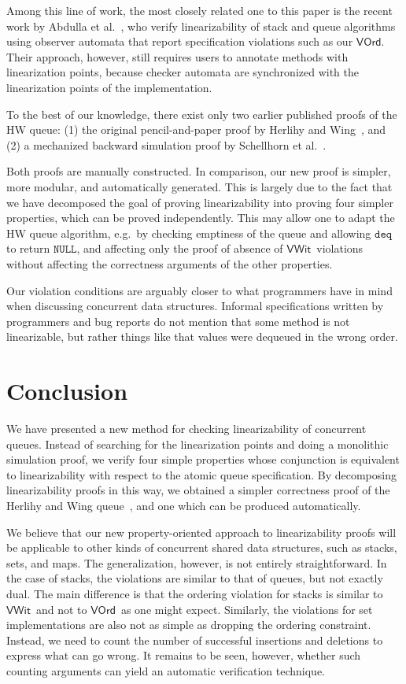 \documentclass{LMCS}
\newcommand{\NULL}{\ensuremath{\mathtt{NULL}}}
\newcommand{\deq}{\ensuremath{\mathtt{deq}}}
\newcommand{\VOrd}{\ensuremath{\mathsf{VOrd}}}
\newcommand{\VWit}{\ensuremath{\mathsf{VWit}}}
\begin{document}
Among this line of work, the most closely related one to this paper is the
recent work by Abdulla et al.~\cite{AHH+2013}, 
who verify linearizability of stack and queue algorithms using observer
automata that report specification violations such as our \VOrd. 
Their approach, however, still requires users to annotate methods
with linearization points, because checker automata are synchronized with the
linearization points of the implementation.

To the best of our knowledge, there exist only two earlier published proofs 
of the HW queue: (1) the original pencil-and-paper proof by Herlihy and
Wing~\cite{HW1990}, and (2) a mechanized backward simulation proof by
Schellhorn et al.~\cite{SWD2012}.

Both proofs are manually constructed. In comparison,  our new proof 
is simpler, more modular, and automatically generated.
This is largely due to the fact that we have decomposed the goal of proving
linearizability into proving four simpler properties,
which can be proved independently.
This may allow one to adapt the HW queue algorithm, e.g.\ by checking
emptiness of the queue and allowing $\deq$ to return \NULL, and affecting
only the proof of absence of \VWit\ violations without affecting the
correctness arguments of the other properties. 

Our violation conditions are arguably closer to what programmers have
in mind when discussing concurrent data structures.  Informal specifications 
written by programmers and bug reports do not mention that some method is 
not linearizable, but rather things like that values were dequeued in the wrong
order.

\section{Conclusion}
\label{sec:conclusion}

We have presented a new method for checking linearizability of concurrent queues.
Instead of searching for the linearization points and doing a monolithic simulation proof, we verify four simple properties whose conjunction is equivalent to linearizability with respect to the atomic queue specification.
By decomposing linearizability proofs in this way, we obtained a simpler correctness proof of the Herlihy and Wing queue~\cite{HW1990}, and one which can be produced automatically.

We believe that our new property-oriented approach to linearizability proofs
will be applicable to other kinds of concurrent shared data structures, such as
stacks, sets, and maps.
The generalization, however, is not entirely straightforward.  In the case of
stacks, the violations are similar to that of queues, but not exactly dual. 
The main difference is that the ordering violation for stacks is similar to
\VWit\ and not to \VOrd\ as one might expect.
Similarly, the violations for set implementations are also not as simple as
dropping the ordering constraint.  Instead, we need to count the number of
successful insertions and deletions to express what can go wrong.  It remains
to be seen, however, whether such counting arguments can yield an automatic
verification technique. 
\end{document}
